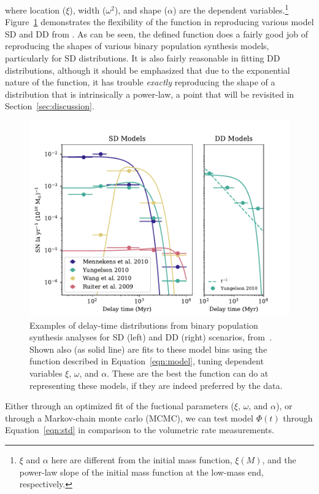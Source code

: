 \documentclass[apj]{aastex62}
\begin{document}
\noindent where location ($\xi$), width ($\omega^2$), and shape ($\alpha$) are the dependent variables.\footnote{$\xi$ and $\alpha$ here are different from the initial mass function, $\xi(M)$, and the power-law slope of the initial mass function at the low-mass end, respectively.} Figure~\ref{fig:dtd_families} demonstrates the flexibility of the function in reproducing various model SD and DD from \cite{Nelemans:2013}. As can be seen, the defined function does a fairly good job of reproducing the shapes of various binary population synthesis models, particularly for SD distributions. It is also fairly reasonable in fitting DD distributions, although it should be emphasized that due to the exponential nature of the function, it has trouble \textit{exactly} reproducing the shape of a distribution that is intrinsically a power-law, a point that will be revisited in Section~\ref{sec:discussion}.

\begin{figure}[t]
   \centering
   \includegraphics[width=6.1in]{figure_sd_dd_fits.pdf}
   \caption{\footnotesize Examples of delay-time distributions from binary population synthesis analyses for SD (left) and DD (right) scenarios, from~\cite{Nelemans:2013}. Shown also (as solid line) are fits to these model bins using the function described in Equation~\ref{eqn:model}, tuning dependent variables $\xi$, $\omega$, and $\alpha$. These are the best the function can do at representing these models, if they are indeed preferred by the data.}
   \label{fig:dtd_families}
\end{figure}

Either through an optimized fit of the fuctional parameters ($\xi$, $\omega$, and $\alpha$), or through a Markov-chain monte carlo (MCMC), we can test model $\Phi(t)$ through Equation~\ref{eqn:std} in comparison to the volumetric rate measurements.
\end{document}

